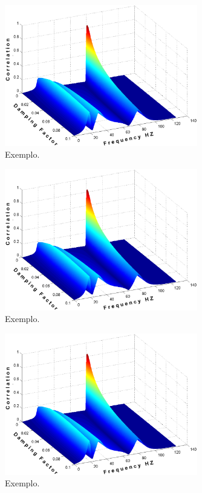 \begin{figure}[htp]
	\centering
	\includegraphics[width=0.75\textwidth]{figuras/fig01.eps}
	\caption[Exemplo]{Exemplo.}
	\label{tela02}
\end{figure}

\begin{figure}[htp]
	\centering
	\includegraphics[width=0.75\textwidth]{figuras/fig01.eps}
	\caption[Exemplo]{Exemplo.}
	\label{tela03}
\end{figure}

\begin{figure}[htp]
	\centering
	\includegraphics[width=0.75\textwidth]{figuras/fig01.eps}
	\caption[Exemplo]{Exemplo.}
	\label{tela04}
\end{figure}


